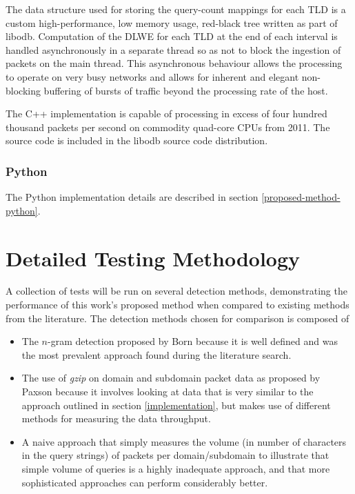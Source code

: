\documentclass[12pt]{report}
\theoremstyle{remark}
\theoremstyle{definition}
\theoremstyle{definition}
\theoremstyle{definition}
\begin{document}
The data structure used for storing the query-count mappings for each TLD is a
custom high-performance, low memory usage, red-black tree written as part of
libodb\cite{Friesen2013}. Computation of the DLWE for each TLD at the end of
each interval is handled asynchronously in a separate thread so as not to block
the ingestion of packets on the main thread. This asynchronous behaviour allows
the processing to operate on very busy networks and allows for inherent and
elegant non-blocking buffering of bursts of traffic beyond the processing rate
of the host.

The C++ implementation is capable of processing in excess of four hundred
thousand packets per second on commodity quad-core CPUs from 2011. The source
code is included in the libodb source code distribution\cite{Friesen2013}.

\subsection{Python} The Python implementation details are described in section
\ref{proposed-method-python}.

\chapter{Detailed Testing Methodology}
A collection of tests will be run on
several detection methods, demonstrating the performance of this work's proposed
method when compared to existing methods from the literature. The detection
methods chosen for comparison is composed of

\label{chosen-methods}
\begin{itemize}
\item The $n$-gram detection proposed by Born\cite{Born2010.cfa} because it is
well defined and was the most prevalent approach found during the literature
search.

\item The use of \emph{gzip} on domain and subdomain packet data as proposed by
Paxson\cite{Paxson2011} because it involves looking at data that is very similar
to the approach outlined in section \ref{implementation}, but makes use of
different methods for measuring the data throughput.

\item A naive approach that simply measures the volume (in number of characters
in the query strings) of packets per domain/subdomain to illustrate that simple
volume of queries is a highly inadequate approach, and that more sophisticated
approaches can perform considerably better.
\end{itemize}
\end{document}
